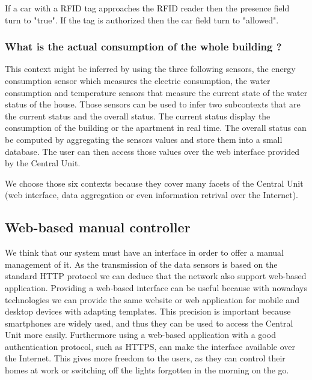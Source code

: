 \documentclass{acm_proc_article-sp}
\begin{document}
If a car with a RFID tag approaches the RFID reader then the presence field turn to "true". If the tag is authorized then the car field turn to "allowed".
 \subsubsection*{What is the actual consumption of the whole building ?}
 This context might be inferred by using the three following sensors, the energy consumption sensor which measures the electric consumption, 
 the water consumption and temperature sensors that measure the current state of the water status of the house.
 Those sensors can be used to infer two subcontexts that are the current status and the overall status.
 The current status display the consumption of the building or the apartment in real time.
 The overall status can be computed by aggregating the sensors values and store them into a small database.
 The user can then access those values over the web interface provided by the Central Unit.

We choose those six contexts because they cover many facets of the Central Unit (web interface, data aggregation or even information retrival over the Internet).

\subsection{Web-based manual controller}
We think that our system must have an interface in order to offer a manual management of it.
As the transmission of the data sensors is based on the standard HTTP protocol we can deduce that the network also support web-based application.
Providing a web-based interface can be useful because with nowadays technologies we can provide the same website or web application for mobile and desktop devices with adapting templates.
This precision is important because smartphones are widely used, and thus they can be used to access the Central Unit more easily. 
Furthermore using a web-based application with a good authentication protocol, such as HTTPS, can make the interface available over the Internet.
This gives more freedom to the users, as they can control their homes at work or switching off the lights forgotten in the morning on the go.
\end{document}
